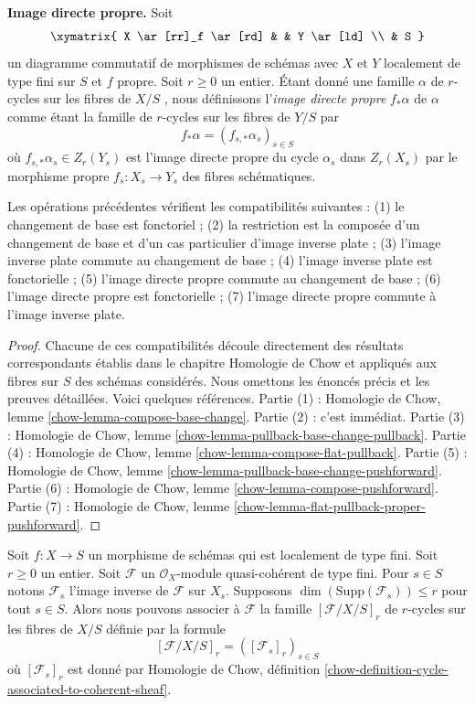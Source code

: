 \medskip\noindent
 {\bf Image directe propre.}  Soit 
$$
\xymatrix{
X \ar[rr]_f \ar[rd] & & Y \ar[ld] \\
& S
}
$$
 un diagramme commutatif de morphismes de schémas avec  $X$  et $Y$
  localement de type fini sur  $S$  et  $f$  propre. Soit $r \geq 0$  un entier. Étant 
donné une famille  $\alpha$  de $r$-cycles sur les fibres de  $X/S$ , nous définissons 
l'{\it image directe propre}   $f_*\alpha$  de $\alpha$  comme étant la famille de  
$r$-cycles sur les fibres de $Y/S$  par 
$$
f_*\alpha = (f_{s, *}\alpha_s)_{s \in S}
$$
 où  $f_{s, *}\alpha_s \in Z_r(Y_s)$  est l'image directe propre
 du cycle  $\alpha_s$  dans  $Z_r(X_s)$ par le morphisme propre  
$f_s : X_s \to Y_s$  des fibres schématiques. 

\begin{lemma} 
\label{lemma-compatibilities} Les 
opérations précédentes vérifient les compatibilités suivantes : (1) le changement
 de base est fonctoriel ; (2) la 
restriction est la composée d'un changement de base et d'un cas particulier d'image inverse
 plate ; (3) 
l'image inverse plate commute au changement de base ; 
(4) l'image inverse plate est fonctorielle
 ; (5) l'image directe propre commute au changement de 
base ; (6) l'image directe propre est fonctorielle 
; (7) l'image directe propre commute à l'image inverse plate. 
\end{lemma} 

\begin{proof}
 Chacune de ces compatibilités découle directement des résultats 
correspondants établis dans le chapitre Homologie de Chow et appliqués aux fibres
 sur $S$ des schémas considérés. Nous omettons les énoncés précis et les 
preuves détaillées. Voici quelques références. Partie
 (1) : Homologie de Chow, lemme 
\ref{chow-lemma-compose-base-change}. Partie 
(2) : c'est immédiat. 
Partie (3) : Homologie de Chow, lemme 
\ref{chow-lemma-pullback-base-change-pullback}. Partie
 (4) : Homologie de Chow, lemme 
\ref{chow-lemma-compose-flat-pullback}. Partie
 (5) : Homologie de Chow, lemme 
\ref{chow-lemma-pullback-base-change-pushforward}. Partie
 (6) : Homologie de Chow, lemme 
\ref{chow-lemma-compose-pushforward}. Partie
 (7) : Homologie de Chow, lemme 
\ref{chow-lemma-flat-pullback-proper-pushforward}. 
\end{proof} 

\begin{example} 
\label{example-family-associated-module} 
Soit  $f : X \to S$  un morphisme de schémas qui est localement de type fini. 
Soit $r \geq 0$  un entier. Soit  $\mathcal{F}$  un  
$\mathcal{O}_X$-module quasi-cohérent de type fini. Pour  $s \in S$  notons  $\mathcal{F}_s$
  l'image inverse de $\mathcal{F}$ sur $X_s$. 
Supposons  $\dim(\text{Supp}(\mathcal{F}_s)) \leq r$  pour tout  $s \in S$.
 Alors nous pouvons associer à  $\mathcal{F}$  la famille  $[\mathcal{F}/X/S]_r$  de 
$r$-cycles sur les fibres de  $X/S$  définie par la formule 
$$
[\mathcal{F}/X/S]_r = ([\mathcal{F}_s]_r)_{s \in S}
$$
 où  $[\mathcal{F}_s]_r$  est donné par Homologie de Chow, définition  
\ref{chow-definition-cycle-associated-to-coherent-sheaf}. 
\end{example} 

